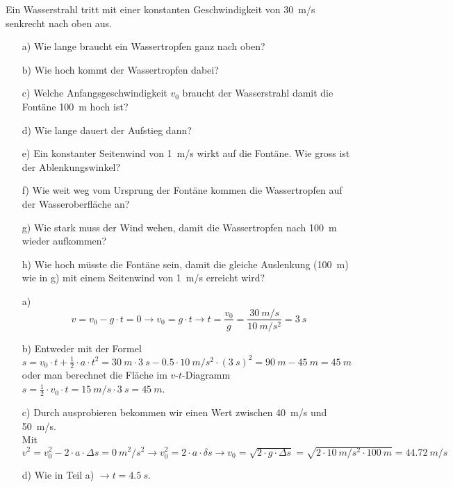 
\begin{aufgabe}
Ein Wasserstrahl tritt mit einer konstanten Geschwindigkeit von
\SI{30}{m/s} senkrecht nach oben aus.
\begin{itemize}
	\item[a)] Wie lange braucht ein Wassertropfen ganz nach oben?
	\item[b)] Wie hoch kommt der Wassertropfen dabei?
	\item[c)] Welche Anfangsgeschwindigkeit $v_0$ braucht der Wasserstrahl damit die
		Fontäne \SI{100}{m} hoch ist?
	\item[d)] Wie lange dauert der Aufstieg dann?
	\item[e)] Ein konstanter Seitenwind von \SI{1}{m/s} wirkt auf die Fontäne.
		Wie gross ist der Ablenkungswinkel?
	\item[f)] Wie weit weg vom Ursprung der Fontäne kommen die Wassertropfen 
		auf der Wasseroberfläche an?
	\item[g)] Wie stark muss der Wind wehen, damit die Wassertropfen nach \SI{100}{m}
		wieder aufkommen?
	\item[h)] Wie hoch müsste die Fontäne sein, damit die gleiche Auslenkung (\SI{100}{m}) wie in g)
		mit einem Seitenwind von \SI{1}{m/s} erreicht wird?
\end{itemize}
\begin{loesung}
	\begin{itemize}
		\item[a)]
	\[v=v_0-g\cdot t = 0 \to v_0=g\cdot t \to t=\frac{v_0}{g}=\frac{\SI{30}{m/s}}{\SI{10}{m/s^2}}=\SI{3}{s}\]
		
\item[b)]
	Entweder mit der Formel $s=v_0\cdot t + \frac{1}{2}\cdot a\cdot t^2 = \SI{30}{m}\cdot\SI{3}{s}-\num{0.5}\cdot\SI{10}{m/s^2}\cdot (\SI{3}{s})^2 = \SI{90}{m}-\SI{45}{m}=\SI{45}{m}$\\
	oder man berechnet die Fläche im $v$-$t$-Diagramm $s=\frac{1}{2}\cdot v_0\cdot t=\SI{15}{m/s}\cdot\SI{3}{s}=\SI{45}{m}$.

\item[c)]
	Durch ausprobieren bekommen wir einen Wert zwischen \SI{40}{m/s} und \SI{50}{m/s}.\\
	Mit $v^2=v_0^2 - 2\cdot a \cdot \Delta s = \SI{0}{m^2/s^2} \to v_0^2 = 2\cdot a\cdot \delta s \to v_0=\sqrt{2\cdot g\cdot \Delta s}=\sqrt{2\cdot\SI{10}{m/s^2}\cdot\SI{100}{m}}=\SI{44.72}{m/s}$

\item[d)]
	Wie in Teil a) $\to t=\SI{4.5}{s}$.


\end{itemize}
\end{loesung}
\end{aufgabe}

